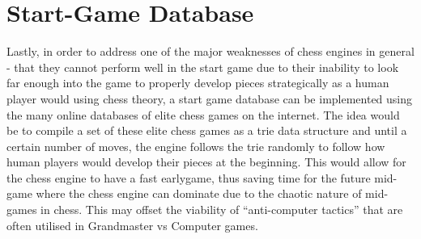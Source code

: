 \section{Start-Game Database}
Lastly, in order to address one of the major weaknesses of chess engines in general - that they cannot perform well in the start game due to their inability to look far enough into the game to properly develop pieces strategically as a human player would using chess theory, a start game database can be implemented using the many online databases of elite chess games on the internet. The idea would be to compile a set of these elite chess games as a trie data structure and until a certain number of moves, the engine follows the trie randomly to follow how human players would develop their pieces at the beginning. This would allow for the chess engine to have a fast earlygame, thus saving time for the future mid-game where the chess engine can dominate due to the chaotic nature of mid-games in chess. This may offset the viability of ``anti-computer tactics'' that are often utilised in Grandmaster vs Computer games.